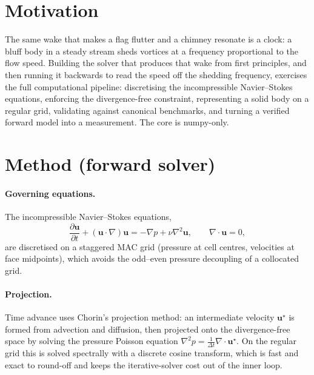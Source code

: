 \documentclass[11pt,a4paper]{article}
\begin{document}
\section{Motivation}
The same wake that makes a flag flutter and a chimney resonate is a clock: a bluff body in a steady
stream sheds vortices at a frequency proportional to the flow speed. Building the solver that
produces that wake from first principles, and then running it backwards to read the speed off the
shedding frequency, exercises the full computational pipeline: discretising the incompressible
Navier--Stokes equations, enforcing the divergence-free constraint, representing a solid body on a
regular grid, validating against canonical benchmarks, and turning a verified forward model into a
measurement. The core is numpy-only.

\section{Method (forward solver)}
\paragraph{Governing equations.} The incompressible Navier--Stokes equations,
\begin{equation}
  \frac{\partial \mathbf{u}}{\partial t} + (\mathbf{u}\cdot\nabla)\mathbf{u}
  = -\nabla p + \nu\nabla^2\mathbf{u},\qquad \nabla\cdot\mathbf{u}=0,
  \label{eq:ns}
\end{equation}
are discretised on a staggered MAC grid (pressure at cell centres, velocities at face midpoints),
which avoids the odd--even pressure decoupling of a collocated grid.

\paragraph{Projection.} Time advance uses Chorin's projection method: an intermediate velocity
$\mathbf{u}^\star$ is formed from advection and diffusion, then projected onto the divergence-free
space by solving the pressure Poisson equation
$\nabla^2 p = \tfrac{1}{\Delta t}\nabla\cdot\mathbf{u}^\star$. On the regular grid this is solved
spectrally with a discrete cosine transform, which is fast and exact to round-off and keeps the
iterative-solver cost out of the inner loop.
\end{document}
